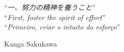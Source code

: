\vfill
\begin{flushright}

\begin{CJK}{UTF8}{min}
``\textit{一、努力の精神を養うこと}''\\
``\textit{First, foster the spirit of effort}''\\
``\textit{Primeiro, criar o intuito do esforço}''\\
\end{CJK}
\vspace{0.4cm}

Kanga Sakukawa

\end{flushright}